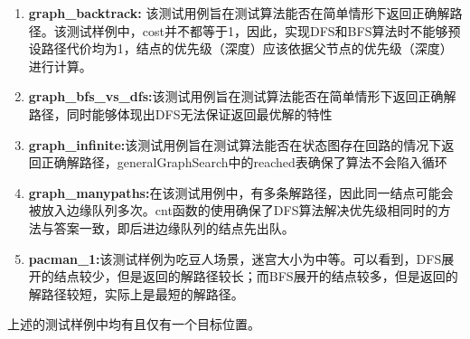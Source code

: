 \begin{enumerate}
    \item {\bfseries graph\_backtrack:} 该测试用例旨在测试算法能否在简单情形下返回正确解路径。该测试样例中，cost并不都等于1，因此，实现DFS和BFS算法时不能够预设路径代价均为1，结点的优先级（深度）应该依据父节点的优先级（深度）进行计算。
    \item {\bfseries graph\_bfs\_vs\_dfs:}该测试用例旨在测试算法能否在简单情形下返回正确解路径，同时能够体现出DFS无法保证返回最优解的特性
    \item {\bfseries graph\_infinite:}该测试用例旨在测试算法能否在状态图存在回路的情况下返回正确解路径，generalGraphSearch中的reached表确保了算法不会陷入循环
    \item {\bfseries graph\_manypaths:}在该测试用例中，有多条解路径，因此同一结点可能会被放入边缘队列多次。cnt函数的使用确保了DFS算法解决优先级相同时的方法与答案一致，即后进边缘队列的结点先出队。
    \item {\bfseries pacman\_1:}该测试样例为吃豆人场景，迷宫大小为中等。可以看到，DFS展开的结点较少，但是返回的解路径较长；而BFS展开的结点较多，但是返回的解路径较短，实际上是最短的解路径。
\end{enumerate}
上述的测试样例中均有且仅有一个目标位置。
